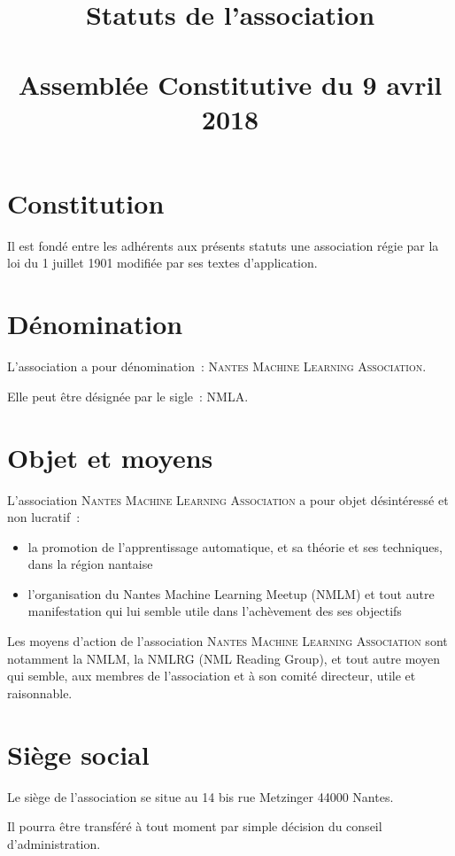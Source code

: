 \documentclass[12 pt]{article}
\title{Statuts de l'association \\
  \Nom \\
  \small Assemblée Constitutive du 9 avril 2018}
\date{}
\newcommand{\Nom}{\textsc{Nantes Machine Learning Association}}
\newcommand{\Sigle}{NMLA}
\begin{document}
\maketitle

\section{Constitution}
\label{sec:constitution}

Il est fondé entre les adhérents aux présents statuts une association
régie par la loi du 1\ier{} juillet 1901 modifiée par ses textes
d'application.

\section{Dénomination}
\label{sec:denomination}
L'association a pour dénomination~: \og\Nom\fg.

Elle peut être désignée par le sigle~: \og\Sigle\fg.

\section{Objet et moyens}
\label{sec:objet-et-moyens}

L'association \Nom{} a pour objet désintéressé et non lucratif~:

\begin{itemize}
\item la promotion de l'apprentissage automatique, et sa théorie et
  ses techniques, dans la région nantaise
\item l'organisation du Nantes Machine Learning Meetup (NMLM) et tout
  autre manifestation qui lui semble utile dans l'achèvement des ses objectifs
\end{itemize}

Les moyens d'action de l'association \Nom{} sont notamment la NMLM, la
NMLRG (NML Reading Group), et tout autre moyen qui semble, aux membres
de l'association et à son comité directeur, utile et raisonnable.

\section{Siège social}
\label{sec:siege-social}

Le siège de l'association se situe au 14 bis rue Metzinger 44000 Nantes.

Il pourra être transféré à tout moment par simple décision du conseil
d'administration.
\end{document}

